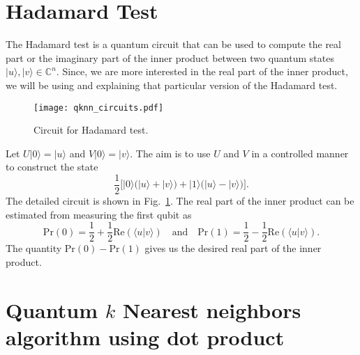 \documentclass[a4paper,twocolumn,11pt,unpublished]{quantumarticle}
\newcommand{\rang}{\rangle}
\begin{document}
\section{Hadamard Test}\label{app:HadamardTest}
        The Hadamard test is a quantum circuit that can be used to compute the real part or the imaginary part of the inner product between two quantum states $|u\rang, |v\rang \in \mathbb{C} ^ {n}$. Since, we are more interested in the real part of the inner product, we will be using and explaining that particular version of the Hadamard test.
        
        \begin{figure}
            \begin{center}
                \texttt{[image: qknn\_circuits.pdf]}
                \caption{Circuit for Hadamard test.}
                \label{fig:hadamard}
            \end{center}
        \end{figure}
        
        Let $U |0\rang = |u\rang$ and $V |0\rang = |v\rang$. The aim is to use $U$ and $V$ in a controlled manner to construct the state 
        \begin{equation}
            \frac{1}{2} \Big[ |0\rang \Big( |u\rang + 
            |v\rang \Big) + |1\rang \Big( |u\rang - |v\rang \Big) \Big].
        \end{equation}
        The detailed circuit is shown in Fig.~\ref{fig:hadamard}. The real part of the inner product can be estimated from measuring the first qubit as
        \begin{equation}
          \text{Pr}(0)  = \frac{1}{2} + \frac{1}{2}\text{Re}(\langle u|v\rangle) \quad \text{and} \quad \text{Pr}(1)  = \frac{1}{2} - \frac{1}{2}\text{Re}(\langle u|v\rangle).
        \end{equation}
        The quantity $\text{Pr}(0)- \text{Pr}(1)$ gives us the desired real part of the inner product.

\section{Quantum $k$ Nearest neighbors algorithm using dot product}\label{app:QKNNdot}
     
\end{document}

